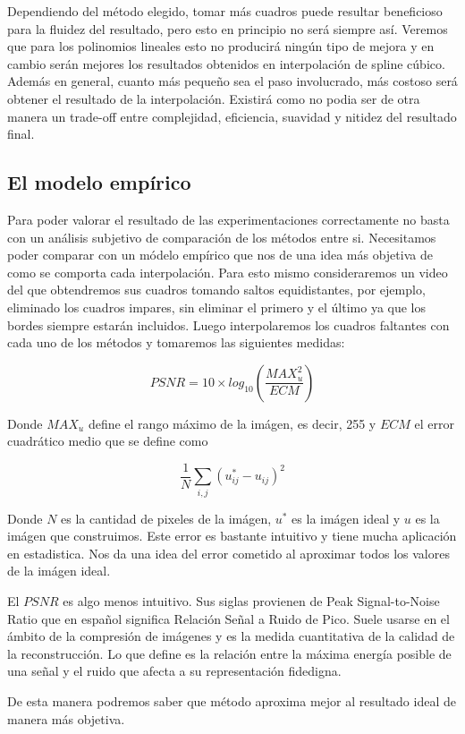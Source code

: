 Dependiendo del método elegido, tomar más cuadros puede resultar beneficioso para la fluidez del resultado, pero esto en principio no será siempre así. Veremos que para los polinomios lineales esto no producirá ningún tipo de mejora y en cambio serán mejores los resultados obtenidos en interpolación de spline cúbico. Además en general, cuanto más pequeño sea el paso involucrado, más costoso será obtener el resultado de la interpolación. Existirá como no podia ser de otra manera un trade-off entre complejidad, eficiencia, suavidad y nitidez del resultado final. 
 
\subsection{El modelo empírico}

Para poder valorar el resultado de las experimentaciones correctamente no basta con un análisis subjetivo de comparación de los métodos entre si. Necesitamos poder comparar con un módelo empírico que nos de una idea más objetiva de como se comporta cada interpolación. Para esto mismo consideraremos un video del que obtendremos sus cuadros tomando saltos equidistantes, por ejemplo, eliminado los cuadros impares, sin eliminar el primero y el último ya que los bordes siempre estarán incluidos. Luego interpolaremos los cuadros faltantes con cada uno de los métodos y tomaremos las siguientes medidas:

\begin{equation}
	PSNR = 10 \times log_{10}(\dfrac{MAX_u^2}{ECM})
\end{equation}

Donde $MAX_u$ define el rango máximo de la imágen, es decir, 255 y $ECM$ el error cuadrático medio que se define como

\begin{equation}
	\dfrac{1}{N}\sum_{i,j}(u_{ij}^* - u_{ij})^2
\end{equation}

Donde $N$ es la cantidad de pixeles de la imágen, $u^*$ es la imágen ideal y $u$ es la imágen que construimos. Este error es bastante intuitivo y tiene mucha aplicación en estadistica. Nos da una idea del error cometido al aproximar todos los valores de la imágen ideal. 

El $PSNR$ es algo menos intuitivo. Sus siglas provienen de Peak Signal-to-Noise Ratio que en español significa Relación Señal a Ruido de Pico. Suele usarse en el ámbito de la compresión de imágenes y es la medida cuantitativa de la calidad de la reconstrucción. Lo que define es la relación entre la máxima energía posible de una señal y el ruido que afecta a su representación fidedigna. 

De esta manera podremos saber que método aproxima mejor al resultado ideal de manera más objetiva. 












